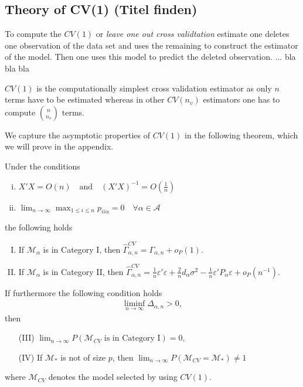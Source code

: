\documentclass[Research_Module_ES.tex]{subfiles}
\begin{document}
\subsection{Theory of CV(1) (Titel finden)}
To compute the $CV(1)$ or \textit{leave one out cross validtation} estimate one deletes one observation of the data set and uses the remaining to construct the estimator of the model. Then one uses this model to predict the deleted observation. ... bla bla bla\

$CV(1)$ is the computationally simplest cross validation estimator as only $n$ terms have to be estimated whereas in other $CV(n_v)$ estimators one has to compute $\binom{n}{n_v}$ terms.\

We capture the asymptotic properties of $CV(1)$ in the following theorem, which we will prove in the appendix.

\begin{satz}[Consistency of $CV(1)$]
Under the conditions 
\begin{enumerate}[(i)]
\item $X'X = O(n) \quad \textrm{and} \quad (X'X)^{-1}=O(\frac{1}{n})$
\item $ \lim_{n \to \infty} \max_{1\le i\le n} p_{ii\alpha} =0 \quad \forall \alpha \in \mathcal{A} $ 
\end{enumerate}
the following holds
\begin{enumerate}[(I)]
\item If $\mathcal{M}_\alpha$ is in Category I, then $\hat{\Gamma}_{\alpha,n}^{CV} = \Gamma_{\alpha,n} + o_P(1)$.
\item If $\mathcal{M}_\alpha$ is in Category II, then $\hat{\Gamma}_{\alpha,n}^{CV} = \frac{1}{n}\varepsilon'\varepsilon + \frac{2}{n}d_\alpha\sigma^2 - \frac{1}{n}\varepsilon'P_\alpha\varepsilon + o_P(n^{-1})$.
\end{enumerate}
If furthermore the following condition holds
\begin{align*}
\liminf_{n\to \infty} \Delta_{\alpha,n} > 0,
\end{align*}
then 
\begin{enumerate}
\item[(III)] $\lim_{n\to\infty} P(\mathcal{M}_{CV}\textrm{ is in Category I})=0$,
\item[(IV)]If $\mathcal{M}_\ast$ is not of size $p$, then $\lim_{n\to\infty}P(\mathcal{M}_{CV}=\mathcal{M}_\ast) \neq 1$
\end{enumerate}
where $\mathcal{M}_{CV}$ denotes the model selected by using $CV(1)$.
\end{satz}
\end{document}
